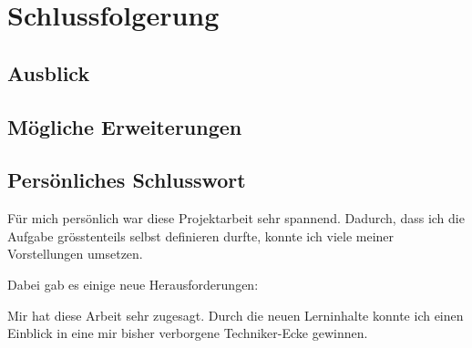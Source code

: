 \chapter{Schlussfolgerung}



\section{Ausblick}
\section{Mögliche Erweiterungen}

\section{Persönliches Schlusswort}
Für mich persönlich war diese Projektarbeit sehr spannend.
Dadurch, dass ich die Aufgabe grösstenteils selbst definieren durfte, konnte ich viele meiner Vorstellungen umsetzen.

Dabei gab es einige neue Herausforderungen:


Mir hat diese Arbeit sehr zugesagt.
Durch die neuen Lerninhalte konnte ich einen Einblick in eine mir bisher verborgene Techniker-Ecke gewinnen.
